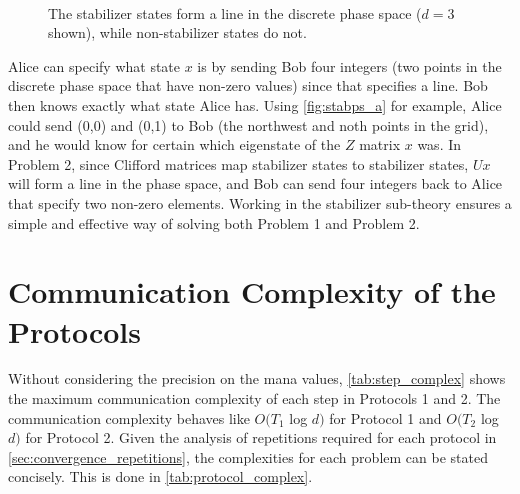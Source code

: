 \documentclass[../3Wworkreport.tex]{subfiles}
\begin{document}
\begin{figure}[h]
	\begin{center}
		\\
		\caption[Discrete phase space and stabilizer states]{The stabilizer states form a line in the discrete phase space ($d = 3$ shown), while non-stabilizer states do not.}
	\end{center}
\end{figure}

Alice can specify what state $x$ is by sending Bob four integers (two points in the discrete phase space that have non-zero values) since that specifies a line. Bob then knows exactly what state Alice has. Using \autoref{fig:stabps_a} for example, Alice could send (0,0) and (0,1) to Bob (the northwest and noth points in the grid), and he would know for certain which eigenstate of the $Z$ matrix $x$ was. In Problem 2, since Clifford matrices map stabilizer states to stabilizer states, $Ux$ will form a line in the phase space, and Bob can send four integers back to Alice that specify two non-zero elements. Working in the stabilizer sub-theory ensures a simple and effective way of solving both Problem 1 and Problem 2.

\section{Communication Complexity of the Protocols}
\label{sec:complexity}
Without considering the precision on the mana values, \autoref{tab:step_complex} shows the maximum communication complexity of each step in Protocols 1 and 2. The communication complexity behaves like $O(T_1$ log $d)$ for Protocol 1 and $O(T_2$ log $d)$ for Protocol 2. Given the analysis of repetitions required for each protocol in \autoref{sec:convergence_repetitions}, the complexities for each problem can be stated concisely. This is done in \autoref{tab:protocol_complex}.\\
\end{document}
